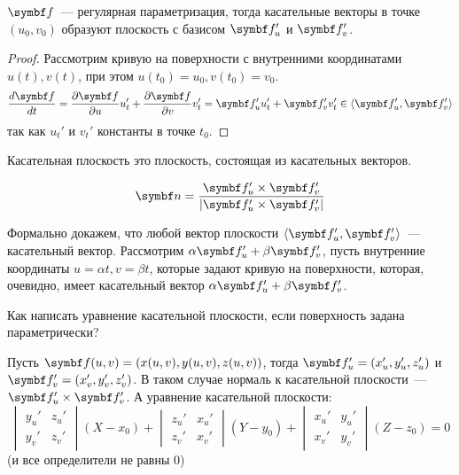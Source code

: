 \documentclass[main]{subfiles}
\begin{document}
\begin{theorem}
    $\vf$~--- регулярная параметризация, тогда касательные векторы в точке $(u_0, v_0)$ образуют плоскость с базисом $\vf_u'$ и $\vf_v'$.
\end{theorem}
\begin{proof}
    Рассмотрим кривую на поверхности с внутренними координатами $u(t), v(t)$,
    при этом $u(t_0) =u_0, v(t_0) = v_0$.
    \begin{gather*}
        \frac{d\vf}{dt} = \frac{\partial\vf}{\partial u} u_t' + \frac{\partial \vf}{\partial v} v_t' = \vf'_u u'_t + \vf_v' v_t' \in \langle \vf_u', \vf_v'\rangle
    \end{gather*}
    так как $u_t'$ и $v_t'$ константы в точке $t_0$.
\end{proof}
\begin{definition}
    Касательная плоскость это плоскость, состоящая из касательных векторов.
\end{definition}
\begin{definition}
    \[\vn = \frac{\vf_u' \times \vf_v'}{|\vf_u' \times \vf_v'|}\]
\end{definition}

Формально докажем, что любой вектор плоскости $\langle \vf_u', \vf_v'\rangle$~--- касательный вектор.
Рассмотрим $\alpha \vf_u' + \beta \vf_v'$, пусть внутренние координаты $u = \alpha t, v = \beta t$,
которые задают кривую на поверхности, которая, очевидно, имеет касательный вектор $\alpha \vf_u' + \beta \vf_v'$.

Как написать уравнение касательной плоскости, если поверхность задана параметрически?

Пусть $\vf(u,v) = (x(u,v), y(u,v), z(u,v))$, тогда $\vf_u' = (x_u', y_u', z_u')$ и $\vf_v' = (x_v', y_v', z_v')$.
В таком случае нормаль к касательной плоскости~--- $\vf_u' \times \vf_v'$.
А уравнение касательной плоскости:
\[\begin{vmatrix}
        y_u' & z_u' \\
        y_v' & z_v'
    \end{vmatrix} (X - x_0 ) +
    \begin{vmatrix}
        z_u' & x_u' \\
        z_v' & x_v'
    \end{vmatrix} (Y - y_0 ) +
    \begin{vmatrix}
        x_u' & y_u' \\
        x_v' & y_v'
    \end{vmatrix} (Z - z_0 ) = 0\]
(и все определители не равны 0)
\end{document}
